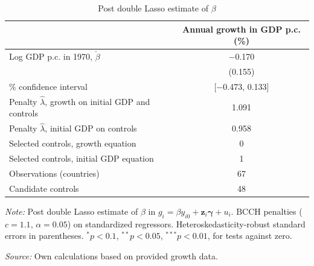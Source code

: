 \begin{table}[!htbp]
\centering
\caption{Post double Lasso estimate of $\beta$}
\label{tab:pdl_estimates}
\begin{threeparttable}
\begin{tabular}{lc}
\toprule
 & Annual growth in GDP p.c. (\%) \\
\midrule
Log GDP p.c. in 1970, $\check{\beta}$ & $-$0.170 \\
 & (0.155) \\
\addlinespace
95\% confidence interval & [$-$0.473, 0.133] \\
\midrule
Penalty $\hat{\lambda}$, growth on initial GDP and controls & 1.091 \\
Penalty $\hat{\lambda}$, initial GDP on controls & 0.958 \\
Selected controls, growth equation & 0 \\
Selected controls, initial GDP equation & 1 \\
\midrule
Observations (countries) & 67 \\
Candidate controls & 48 \\
\bottomrule
\end{tabular}
\begin{tablenotes}[flushleft]
\footnotesize
\item \textit{Note:} Post double Lasso estimate of $\beta$ in $g_i = \beta y_{i0} + \mathbf{z}_i\boldsymbol{\gamma} + u_i$. BCCH penalties ($c=1.1$, $\alpha=0.05$) on standardized regressors. Heteroskedasticity-robust standard errors in parentheses. $^{*}p<0.1$, $^{**}p<0.05$, $^{***}p<0.01$, for tests against zero.
\item \textit{Source:} Own calculations based on provided growth data.
\end{tablenotes}
\end{threeparttable}
\end{table}